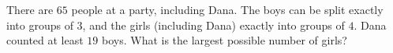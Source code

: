 There are $65$ people at a party, including Dana. The boys can be split exactly into groups of $3$, and the girls (including Dana) exactly into groups of $4$. Dana counted at least $19$ boys. What is the largest possible number of girls?
